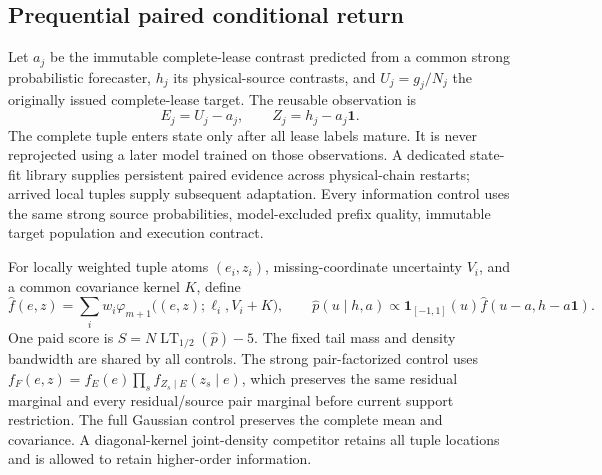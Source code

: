 \subsection{Prequential paired conditional return}
Let $a_j$ be the immutable complete-lease contrast predicted from a common
strong probabilistic forecaster, $h_j$ its physical-source contrasts,
and $U_j=g_j/N_j$ the originally issued complete-lease target. The reusable
observation is
\begin{equation}
 E_j=U_j-a_j,\qquad Z_j=h_j-a_j\mathbf1.
 \label{eq:prequential-paired-residual}
\end{equation}
The complete tuple enters state only after all lease labels mature. It
is never reprojected using a later model trained on those observations.
A dedicated state-fit library supplies persistent paired evidence across
physical-chain restarts; arrived local tuples supply subsequent adaptation.
Every information control uses the same strong source probabilities,
model-excluded prefix quality, immutable target population and execution
contract.

For locally weighted tuple atoms $(e_i,z_i)$, missing-coordinate uncertainty
$V_i$, and a common covariance kernel $K$, define
\begin{equation}
 \widehat f(e,z)=\sum_iw_i\varphi_{m+1}
 \bigl((e,z);\ell_i,V_i+K\bigr),\qquad
 \widehat p(u\mid h,a)\propto
 \mathbf1_{[-1,1]}(u)\widehat f(u-a,h-a\mathbf1).
 \label{eq:prequential-conditional-return}
\end{equation}
One paid score is
$S=N\operatorname{LT}_{1/2}(\widehat p)-5$.
The fixed tail mass and density bandwidth are shared by all controls.
The strong pair-factorized control uses
$f_F(e,z)=f_E(e)\prod_s f_{Z_s\mid E}(z_s\mid e)$, which preserves the
same residual marginal and every residual/source pair marginal before
current support restriction. The full Gaussian control preserves the
complete mean and covariance. A diagonal-kernel joint-density competitor
retains all tuple locations and is allowed to retain higher-order information.

